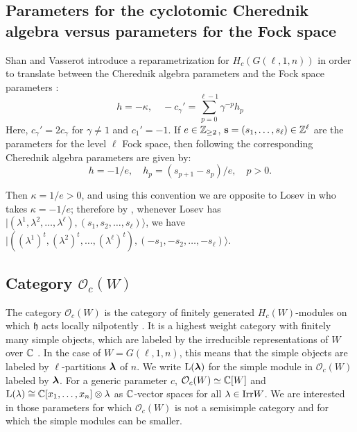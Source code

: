 \documentclass[12pt]{amsart}
\numberwithin{equation}{section}
\theoremstyle{definition}
\newcommand{\oh}{\mathcal{O}}
\newcommand{\el}{\mathrm{L}}
\newcommand{\mbs}{\mathbf{s}}
\newcommand{\mfh}{\mathfrak{h}}
\begin{document}
\subsection{Parameters for the cyclotomic Cherednik algebra versus parameters for the Fock space}\label{RCAparams2} Shan and Vasserot introduce a reparametrization for $H_c(G(\ell,1,n))$ in order to translate between the Cherednik algebra parameters and the Fock space parameters \cite[Section 3.3]{ShanVasserot2012}:
$$h=-\kappa,\quad -c_\gamma'=\sum_{p=0}^{\ell-1}\gamma^{-p}h_p$$
Here, $c_\gamma'=2c_\gamma$ for $\gamma\neq 1$ and $c_1'=-1$. If $e\in\mathbb{Z}_{\geq 2}$, $\mbs=(s_1,\dots,s_\ell)\in\Z^\ell$ are the parameters for the level $\ell$ Fock space, then following \cite[Theorem 6.10]{ShanVasserot2012} the corresponding Cherednik algebra parameters are given by:
$$h=-1/e,\quad h_p=(s_{p+1}-s_p)/e,\quad p>0. $$

Then $\kappa=1/e>0$, and using this convention we are opposite to Losev in \cite{Losev2015} who takes $\kappa=-1/e$; therefore by \cite[Section 4.1.4]{Losev2015}, whenever Losev has $|(\lambda^1,\lambda^2,\dots,\lambda^\ell),(s_1,s_2,\dots,s_\ell)\rangle$, we have\\ $|((\lambda^1)^t,(\lambda^2)^t,\dots,(\lambda^\ell)^t),(-s_1,-s_2,\dots,-s_\ell)\rangle$.

\subsection{Category $\oh_c(W)$} %
The category $\oh_c(W)$ is the category of finitely generated $H_c(W)$-modules on which $\mfh$ acts locally nilpotently \cite{GGOR}. It is a highest weight category with finitely many simple objects, which are labeled by the irreducible representations of $W$ over $\mathbb{C}$ \cite{GGOR}. In the case of $W=G(\ell,1,n)$, this means that the simple objects are labeled by $\ell$-partitions $\boldsymbol{\lambda}$ of $n$. We write $\el(\bla)$ for the simple module in $\oh_c(W)$ labeled by $\boldsymbol{\lambda}$. For a generic parameter $c$, $\oh_c(W)\simeq \C[W]$ and $\el(\lambda)\cong \C[x_1,\dots,x_n]\otimes\lambda$ as $\mathbb{C}$-vector spaces for all $\lambda\in\text{\rm Irr} W$. We are interested in those parameters for which $\oh_c(W)$ is not a semisimple category and for which the simple modules can be smaller.
\end{document}
